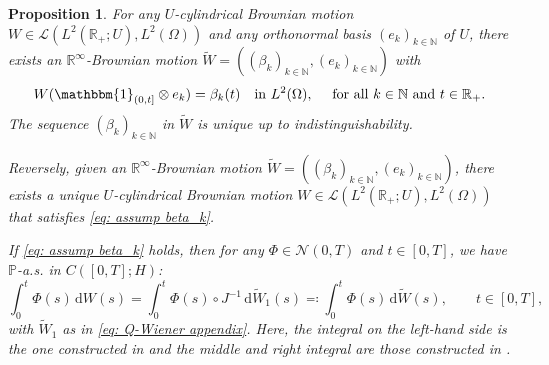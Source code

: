 \documentclass{amsart}
\newcommand{\dd}{\,\mathrm{d}}
\newcommand{\one}{\mathbbm{1}}
\newcommand{\<}{\langle}
\newcommand{\?}{\rangle}
\theoremstyle{plain}
\theoremstyle{remark}
\theoremstyle{plain}
\newtheorem{proposition}[theorem]{Proposition}
\numberwithin{equation}{section}
\def\N{{\mathbb N}}
\def\R{{\mathbb R}}
\renewcommand{\P}{\mathbb{P}}
\newcommand{\Om}{\Omega}
\begin{document}
\begin{proposition}\label{prop: equiv cyl BM}
For any $U$-cylindrical Brownian motion $W\in\mathcal{L}(L^2(\R_+;U),L^2(\Omega))$ and any orthonormal basis $(e_k)_{k\in\N}$ of $U$, there exists an $\R^\infty$-Brownian motion $\tilde{W}=((\beta_k)_{k\in\N},(e_k)_{k\in\N})$ with
\begin{equation}\label{eq: assump beta_k}
W(\one_{(0,t]}\otimes e_k)=\beta_k(t) \text{\quad in }L^2(\Om),\quad\text{ for all } k\in\N \text{ and } t\in \R_+.
\end{equation}
The sequence $(\beta_k)_{k\in\N}$ in $\tilde{W}$ is unique up to indistinguishability.

Reversely, given an $\R^\infty$-Brownian motion $\tilde{W}=((\beta_k)_{k\in\N},(e_k)_{k\in\N})$, there exists a unique $U$-cylindrical Brownian motion $W\in\mathcal{L}(L^2(\R_+;U),L^2(\Omega))$ that satisfies \eqref{eq: assump beta_k}.

If \eqref{eq: assump beta_k} holds, then for  any $\Phi\in \mathcal{N}(0,T)$ and $t\in[0,T]$, we have $\P$-a.s. \!in $C([0,T];H)$:
\begin{equation}\label{eq: identity stoch integrals defs}
\int_0^t \Phi(s)\dd W(s)=\int_0^t \Phi(s)\circ J^{-1}\dd \tilde{W}_1(s)\eqqcolon \int_0^t \Phi(s)\dd \tilde{W}(s),\qquad  t\in[0,T],
\end{equation}
with $\tilde{W}_1$ as in \eqref{eq: Q-Wiener appendix}. Here, the integral on the left-hand side is the one constructed in \cite{NVW15} and the middle and right integral are those constructed in \cite[\S 2.3, \S 2.5]{liurockner15}.
\end{proposition}

\printbibliography%
\end{document}
